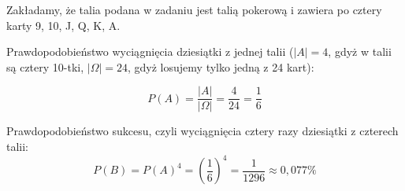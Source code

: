 \medskip
{} 
\medskip

Zakładamy, że talia podana w zadaniu jest talią pokerową i zawiera
po cztery karty 9, 10, J, Q, K, A.

Prawdopodobieństwo wyciągnięcia dziesiątki z jednej talii ($|A|=4$,
gdyż w talii są cztery 10-tki, $|\Omega|=24$, gdyż losujemy tylko jedną z 24 kart):

$$
P(A)=\frac{|A|}{|\Omega|}=\frac{4}{24}=\frac{1}{6}
$$

Prawdopodobieństwo sukcesu, czyli wyciągnięcia cztery razy dziesiątki
z czterech talii:
$$
P(B)=P(A)^4=(\frac{1}{6})^4=\frac{1}{1296}\approx0,077\%
$$
